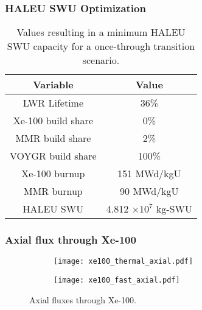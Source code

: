 \begin{frame}
    \frametitle{HALEU SWU Optimization}
    
\begin{table}[h!]
    \centering 
    \caption{Values resulting in a minimum \gls{HALEU} \gls{SWU} capacity for 
              a once-through transition scenario.}
    \label{tab:soga_ot_haleu}
    \begin{tabular}{c c}
        \hline
        Variable & Value \\
        \hline
        LWR Lifetime & 36\%\\
        Xe-100 build share & 0\%\\
        MMR build share & 2\%\\
        VOYGR build share & 100\%\\
        Xe-100 burnup & 151 MWd/kgU\\
        MMR burnup & 90 MWd/kgU\\
        \hline
        HALEU SWU & 4.812 $\times 10^7$ kg-SWU\\
        \hline
    \end{tabular}
\end{table}
    
\end{frame}

\begin{frame}
    \frametitle{Axial flux through Xe-100}
    \begin{figure}
        \centering 
        \begin{subfigure}{0.49\textwidth}
            \texttt{[image: xe100\_thermal\_axial.pdf]}
        \end{subfigure}
        \begin{subfigure}{0.49\textwidth}
            \texttt{[image: xe100\_fast\_axial.pdf]}
        \end{subfigure}
        \caption{Axial fluxes through Xe-100.}
        \label{fig:xe100-axial-flux}
    \end{figure}
\end{frame}


